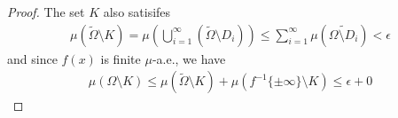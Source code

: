\begin{proof}
  The set $K$ also satisifes 
  \begin{align*}
    \mu(\tilde{\Omega} \setminus K) = \mu\left(
      \bigcup_{i=1}^{\infty} (\tilde{\Omega} \setminus D_i)
    \right)
    \leq \sum_{i=1}^{\infty} \mu(\tilde{\Omega \setminus D_i}) < \epsilon
  \end{align*}
  and since $f(x)$ is finite $\mu$-a.e., we have
  \begin{align*}
    \mu(\Omega \setminus K) \leq \mu(\tilde{\Omega} \setminus K) + \mu(f^{-1}\{\pm \infty\} \setminus K) \leq \epsilon + 0
  \end{align*}

  

\end{proof}



